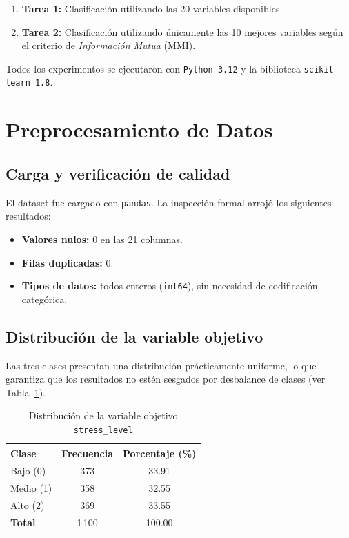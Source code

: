 \documentclass[12pt, letterpaper]{article}
\begin{document}
\begin{enumerate}
    \item \textbf{Tarea 1:} Clasificación utilizando las 20 variables disponibles.
    \item \textbf{Tarea 2:} Clasificación utilizando únicamente las 10 mejores
          variables según el criterio de \textit{Información Mutua} (MMI).
\end{enumerate}

Todos los experimentos se ejecutaron con \texttt{Python 3.12} y la biblioteca
\texttt{scikit-learn 1.8}.

\section{Preprocesamiento de Datos}

\subsection{Carga y verificación de calidad}

El dataset fue cargado con \texttt{pandas}. La inspección formal arrojó los
siguientes resultados:

\begin{itemize}
    \item \textbf{Valores nulos:} 0 en las 21 columnas.
    \item \textbf{Filas duplicadas:} 0.
    \item \textbf{Tipos de datos:} todos enteros (\texttt{int64}), sin necesidad
          de codificación categórica.
\end{itemize}

\subsection{Distribución de la variable objetivo}

Las tres clases presentan una distribución prácticamente uniforme, lo que
garantiza que los resultados no estén sesgados por desbalance de clases
(ver Tabla~\ref{tab:distribucion}).

\begin{table}[H]
    \centering
    \caption{Distribución de la variable objetivo \texttt{stress\_level}}
    \label{tab:distribucion}
    \begin{tabular}{lcc}
        \toprule
        \textbf{Clase} & \textbf{Frecuencia} & \textbf{Porcentaje (\%)} \\
        \midrule
        \rowcolor{rowgray} Bajo (0)  & 373 & 33.91 \\
        Medio (1)                    & 358 & 32.55 \\
        \rowcolor{rowgray} Alto (2)  & 369 & 33.55 \\
        \midrule
        \textbf{Total} & 1\,100 & 100.00 \\
        \bottomrule
    \end{tabular}
\end{table}
\end{document}
